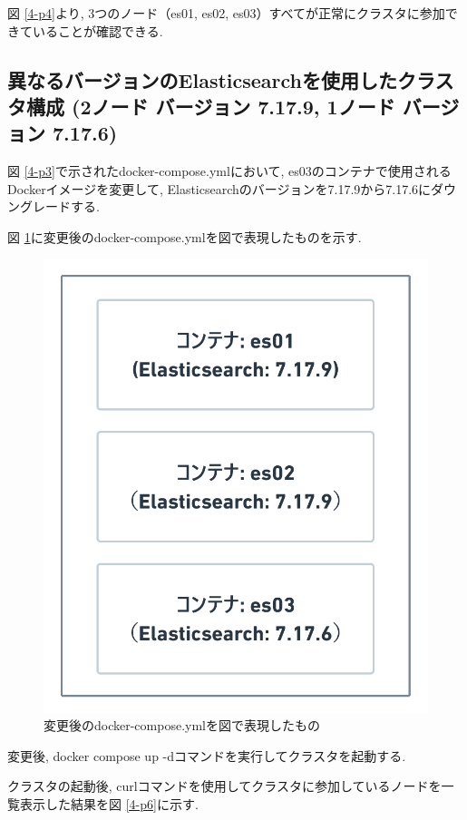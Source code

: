 図 \ref{4-p4}より, 3つのノード（es01, es02, es03）すべてが正常にクラスタに参加できていることが確認できる.

\subsection{異なるバージョンのElasticsearchを使用したクラスタ構成 (2ノード バージョン 7.17.9, 1ノード バージョン 7.17.6)}

図 \ref{4-p3}で示されたdocker-compose.ymlにおいて, es03のコンテナで使用されるDockerイメージを変更して, Elasticsearchのバージョンを7.17.9から7.17.6にダウングレードする.

図 \ref{4-p5}に変更後のdocker-compose.ymlを図で表現したものを示す.

\begin{figure}[H]
  \begin{center}
    \includegraphics[width=120mm]{sotu/figure/2-7.19.9-and-1-7.17.6.png}
    \caption{変更後のdocker-compose.ymlを図で表現したもの}
    \label{4-p5}
  \end{center}
\end{figure}

変更後, docker compose up -dコマンドを実行してクラスタを起動する.

クラスタの起動後, curlコマンドを使用してクラスタに参加しているノードを一覧表示した結果を図 \ref{4-p6}に示す.


